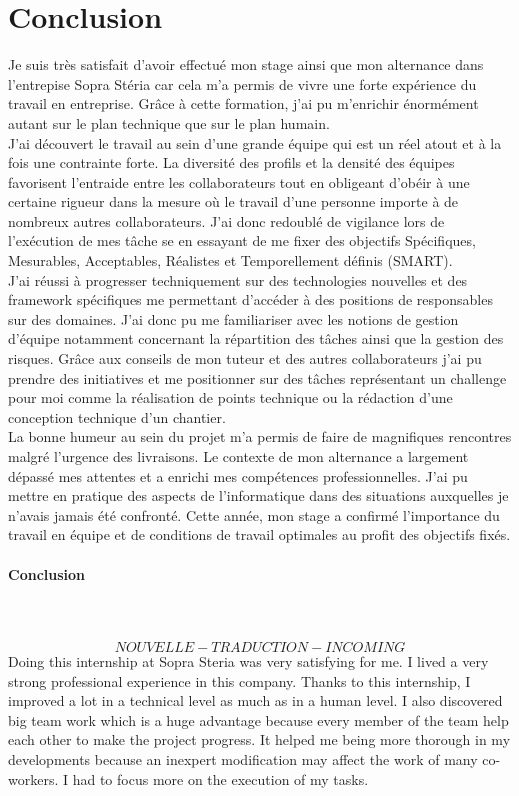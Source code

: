 \documentclass[12pt,a4paper]{article}
\begin{document}
\section{Conclusion}
Je suis très satisfait d’avoir effectué mon stage ainsi que mon alternance dans l'entrepise Sopra Stéria car cela m’a permis de vivre une forte expérience du travail en entreprise. Grâce à cette formation, j’ai pu m’enrichir énormément autant sur le plan technique que sur le plan humain.\\
J’ai découvert le travail au sein d'une grande équipe qui est un réel atout et à la fois une contrainte forte. La diversité des profils et la densité des équipes favorisent l'entraide entre les collaborateurs tout en obligeant d'obéir à une certaine rigueur dans la mesure où le travail d'une personne importe à de nombreux autres collaborateurs. J’ai donc redoublé de vigilance lors de l’exécution de mes tâche se en essayant de me fixer des objectifs Spécifiques, Mesurables, Acceptables, Réalistes et Temporellement définis (SMART).\\
J'ai réussi à progresser techniquement sur des technologies nouvelles et des framework spécifiques me permettant d'accéder à des positions de responsables sur des domaines. J'ai donc pu me familiariser avec les notions de gestion d'équipe notamment concernant la répartition des tâches ainsi que la gestion des risques. Grâce aux conseils de mon tuteur et des autres collaborateurs j'ai pu prendre des initiatives et me positionner sur des tâches représentant un challenge pour moi comme la réalisation de points technique ou la rédaction d'une conception technique d'un chantier. \\
La bonne humeur au sein du projet m'a permis de faire de magnifiques rencontres malgré l’urgence des livraisons. Le contexte de mon alternance a largement dépassé mes attentes et a enrichi mes compétences professionnelles. J'ai pu mettre en pratique des aspects de l'informatique dans des situations auxquelles je n'avais jamais été confronté.
Cette année, mon stage a confirmé l'importance du travail en équipe et de conditions de travail optimales au profit des objectifs fixés.
\paragraph{Conclusion}
~~\\\\
\[NOUVELLE-TRADUCTION-INCOMING\]
Doing this internship at Sopra Steria was very satisfying for me. I lived a very strong professional experience in this company. Thanks to this internship, I improved a lot in a technical level as much as in a human level. I also discovered big team work which is a huge advantage because every member of the team help each other to make the project progress. It helped me being more thorough in my developments because an inexpert modification may affect the work of many co-workers. I had to focus more on the execution of my tasks.
\end{document}
